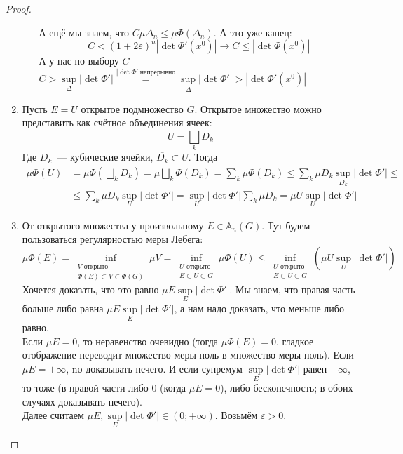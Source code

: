 \documentclass{article}
\let\eps\varepsilon
\begin{document}
\begin{proof}
\begin{enumerate}
\begin{enumerate}
$$                $$
                А ещё мы знаем, что $C\mu\Delta_n\leqslant\mu\Phi(\Delta_n)$. А это уже капец:
                $$
                C<(1+2\eps)^n|\det\Phi'(x^0)|\longrightarrow C\leqslant|\det\Phi(x^0)|
                $$
                А у нас по выбору $C$ $C>\sup\limits_{\Delta}|\det\Phi'|\overset{|\det\Phi'|\text{непрерывно}}=\sup\limits_{\overline\Delta}|\det\Phi'|>|\det\Phi'(x^0)|$
            \end{enumerate}
            \item Пусть $E=U$ открытое подмножество $G$. Открытое множество можно представить как счётное объединения ячеек:
            $$
            U=\bigsqcup\limits_k D_k
            $$
            Где $D_k$~--- кубические ячейки, $\overline{D_k}\subset U$. Тогда
            \[\begin{split}
                \mu\Phi(U)&=\mu\Phi\left(\bigsqcup\limits_k D_k\right)=\mu\bigsqcup\limits_k\Phi(D_k)=\sum\limits_k\mu\Phi(D_k)\leqslant\sum\limits_k\mu D_k\sup\limits_{D_k}|\det\Phi'|\leqslant\\
                &\leqslant\sum\limits_k\mu D_k\sup\limits_{U}|\det\Phi'|=\sup\limits_U|\det\Phi'|\sum\limits_k\mu D_k=\mu U\sup\limits_U|\det\Phi'|
            \end{split}\]
            \item От открытого множества у произвольному $E\in\mathbb A_n(G)$. Тут будем пользоваться регулярностью меры Лебега:
            $$
            \mu\Phi(E)=\inf\limits_{\substack{V\text{ открыто}\\\Phi(E)\subset V\subset\Phi(G)}}\mu V=\inf\limits_{\substack{U\text{ открыто}\\E\subset U\subset G}}\mu\Phi(U)\leqslant\inf\limits_{\substack{U\text{ открыто}\\E\subset U\subset G}}\left(\mu U\sup\limits_U|\det\Phi'|\right)
            $$
            Хочется доказать, что это равно $\mu E\sup\limits_E|\det\Phi'|$. Мы знаем, что правая часть больше либо равна $\mu E\sup\limits_E|\det\Phi'|$, а нам надо доказать, что меньше либо равно.\\
            Если $\mu E=0$, то неравенство очевидно (тогда $\mu\Phi(E)=0$, гладкое отображение переводит множество меры ноль в множество меры ноль). Если $\mu E=+\infty$, nо доказывать нечего. И если супремум $\sup\limits_E|\det\Phi'|$ равен $+\infty$, то тоже (в правой части либо 0 (когда $\mu E=0$), либо бесконечность; в обоих случаях доказывать нечего).\\
            Далее считаем $\mu E,\sup\limits_E|\det\Phi'|\in(0;+\infty)$. Возьмём $\eps>0$.

\end{enumerate}
\end{proof}
\end{document}
